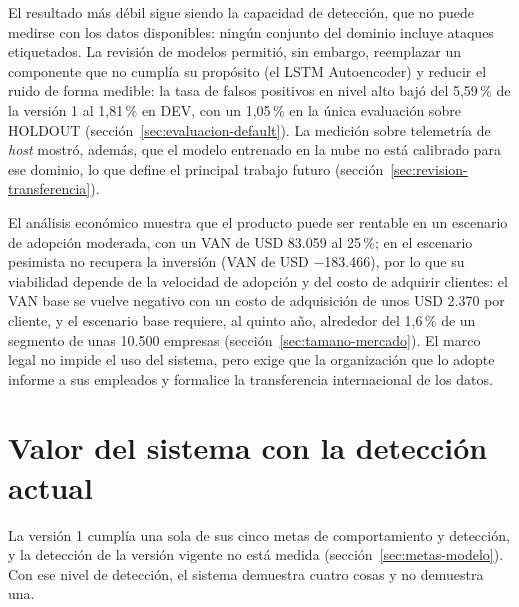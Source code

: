 El resultado más débil sigue siendo la capacidad de detección, que no puede medirse con los datos disponibles: ningún conjunto del dominio incluye ataques etiquetados. La revisión de modelos permitió, sin embargo, reemplazar un componente que no cumplía su propósito (el LSTM Autoencoder) y reducir el ruido de forma medible: la tasa de falsos positivos en nivel alto bajó del 5,59\,\% de la versión 1 al 1,81\,\% en DEV, con un 1,05\,\% en la única evaluación sobre HOLDOUT (sección~\ref{sec:evaluacion-default}). La medición sobre telemetría de \emph{host} mostró, además, que el modelo entrenado en la nube no está calibrado para ese dominio, lo que define el principal trabajo futuro (sección~\ref{sec:revision-transferencia}).

El análisis económico muestra que el producto puede ser rentable en un escenario de adopción
moderada, con un VAN de USD 83.059 al 25\,\%; en el escenario pesimista no recupera la inversión (VAN de USD $-$183.466), por lo que su viabilidad depende de la velocidad de
adopción y del costo de adquirir clientes: el VAN base se vuelve negativo con un costo de adquisición de unos USD 2.370 por cliente, y el escenario base requiere, al quinto año, alrededor del 1,6\,\% de un segmento de unas 10.500 empresas (sección~\ref{sec:tamano-mercado}). El marco legal no impide el uso del sistema, pero exige
que la organización que lo adopte informe a sus empleados y formalice la transferencia
internacional de los datos.

\section{Valor del sistema con la detección actual}\label{sec:valor-sistema}
La versión 1 cumplía una sola de sus cinco metas de comportamiento y detección, y la detección de la versión vigente no está medida (sección~\ref{sec:metas-modelo}). Con ese nivel de detección, el sistema demuestra cuatro cosas y no demuestra una.

